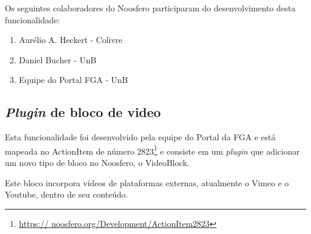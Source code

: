 Os seguintes colaboradores do Noosfero participaram do desenvolvimento desta
funcionalidade:

\begin{enumerate}

\item Aurélio A. Heckert - Colivre

\item Daniel Bucher - UnB

\item Equipe do Portal FGA - UnB

\end{enumerate}

\subsection{\textit{Plugin} de bloco de video}

Esta funcionalidade foi desenvolvido pela equipe do Portal
da FGA e está mapeada no ActionItem de número 2823\footnote{\url{https://
noosfero.org/Development/ActionItem2823}} e consiste em um \textit{plugin}
que adicionar um novo tipo de bloco no Noosfero, o VideoBlock.

Este bloco incorpora vídeos de plataformas externas, atualmente o Vimeo
e o Youtube, dentro de seu conteúdo.


